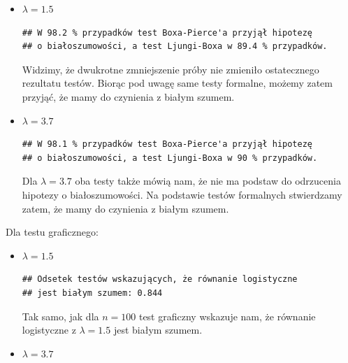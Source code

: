 \documentclass[10pt, a4paper]{article}\usepackage[]{graphicx}\usepackage[]{xcolor}
\makeatletter
\newenvironment{kframe}{%
 \def\at@end@of@kframe{}%
 \ifinner\ifhmode%
  \def\at@end@of@kframe{\end{minipage}}%
  \begin{minipage}{\columnwidth}%
 \fi\fi%
 \def\FrameCommand##1{\hskip\@totalleftmargin \hskip-\fboxsep
 \colorbox{shadecolor}{##1}\hskip-\fboxsep
     \hskip-\linewidth \hskip-\@totalleftmargin \hskip\columnwidth}%
 \MakeFramed {\advance\hsize-\width
   \@totalleftmargin\z@ \linewidth\hsize
   \@setminipage}}%
 {\par\unskip\endMakeFramed%
 \at@end@of@kframe}
\newenvironment{knitrout}{}{} %
\makeatother
\begin{document}
\begin{enumerate}
\begin{itemize}
\item $\lambda=1.5$
\begin{knitrout}
\color{fgcolor}\begin{kframe}
\begin{verbatim}
## W 98.2 % przypadków test Boxa-Pierce'a przyjął hipotezę 
## o białoszumowości, a test Ljungi-Boxa w 89.4 % przypadków.
\end{verbatim}
\end{kframe}
\end{knitrout}
Widzimy, że dwukrotne zmniejszenie próby nie zmieniło ostatecznego rezultatu testów. Biorąc pod uwagę same testy formalne, możemy zatem przyjąć, że mamy do czynienia z białym szumem.
\item $\lambda=3.7$
\begin{knitrout}
\color{fgcolor}\begin{kframe}
\begin{verbatim}
## W 98.1 % przypadków test Boxa-Pierce'a przyjął hipotezę 
## o białoszumowości, a test Ljungi-Boxa w 90 % przypadków.
\end{verbatim}
\end{kframe}
\end{knitrout}
Dla $\lambda=3.7$ oba testy także mówią nam, że nie ma podstaw do odrzucenia hipotezy o białoszumowości. Na podstawie testów formalnych stwierdzamy zatem, że mamy do czynienia z białym szumem.
\end{itemize}
Dla testu graficznego:
\begin{itemize}
\item $\lambda=1.5$
\begin{knitrout}
\color{fgcolor}\begin{kframe}
\begin{verbatim}
## Odsetek testów wskazujących, że równanie logistyczne
## jest białym szumem: 0.844
\end{verbatim}
\end{kframe}
\end{knitrout}
Tak samo, jak dla $n=100$ test graficzny wskazuje nam, że równanie logistyczne z $\lambda=1.5$ jest białym szumem.
\item $\lambda=3.7$
\begin{knitrout}
\color{fgcolor}\begin{kframe}

\end{kframe}
\end{knitrout}
\end{itemize}
\end{enumerate}
\end{document}
